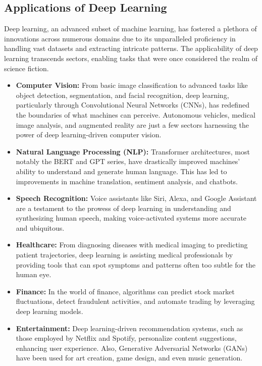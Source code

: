 \subsection{Applications of Deep Learning}

Deep learning, an advanced subset of machine learning, has fostered a plethora of innovations across numerous domains due to its unparalleled proficiency in handling vast datasets and extracting intricate patterns. The applicability of deep learning transcends sectors, enabling tasks that were once considered the realm of science fiction.

\begin{itemize}
    \item \textbf{Computer Vision:} From basic image classification to advanced tasks like object detection, segmentation, and facial recognition, deep learning, particularly through Convolutional Neural Networks (CNNs), has redefined the boundaries of what machines can perceive. Autonomous vehicles, medical image analysis, and augmented reality are just a few sectors harnessing the power of deep learning-driven computer vision.
    
    \item \textbf{Natural Language Processing (NLP):} Transformer architectures, most notably the BERT and GPT series, have drastically improved machines' ability to understand and generate human language. This has led to improvements in machine translation, sentiment analysis, and chatbots.
    
    \item \textbf{Speech Recognition:} Voice assistants like Siri, Alexa, and Google Assistant are a testament to the prowess of deep learning in understanding and synthesizing human speech, making voice-activated systems more accurate and ubiquitous.
    
    \item \textbf{Healthcare:} From diagnosing diseases with medical imaging to predicting patient trajectories, deep learning is assisting medical professionals by providing tools that can spot symptoms and patterns often too subtle for the human eye.
    
    \item \textbf{Finance:} In the world of finance, algorithms can predict stock market fluctuations, detect fraudulent activities, and automate trading by leveraging deep learning models.
    
    \item \textbf{Entertainment:} Deep learning-driven recommendation systems, such as those employed by Netflix and Spotify, personalize content suggestions, enhancing user experience. Also, Generative Adversarial Networks (GANs) have been used for art creation, game design, and even music generation.
\end{itemize}

